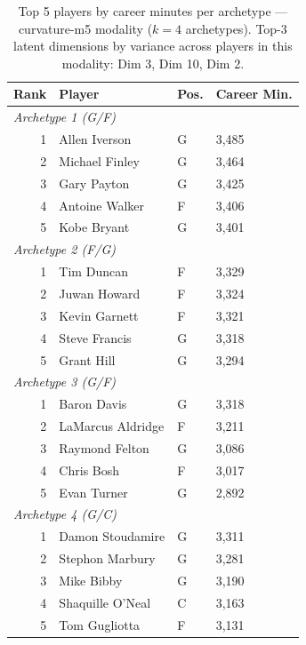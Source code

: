 \begin{table}[htbp]
  \centering\small
  \begin{tabular}{rlll}
    \toprule
    Rank & Player & Pos. & Career Min. \\
    \midrule
    \multicolumn{4}{l}{\textit{Archetype 1 (G/F)}} \\
    \midrule
    1 & Allen Iverson & G & 3,485 \\
    2 & Michael Finley & G & 3,464 \\
    3 & Gary Payton & G & 3,425 \\
    4 & Antoine Walker & F & 3,406 \\
    5 & Kobe Bryant & G & 3,401 \\
    \midrule[0.4pt]
    \multicolumn{4}{l}{\textit{Archetype 2 (F/G)}} \\
    \midrule
    1 & Tim Duncan & F & 3,329 \\
    2 & Juwan Howard & F & 3,324 \\
    3 & Kevin Garnett & F & 3,321 \\
    4 & Steve Francis & G & 3,318 \\
    5 & Grant Hill & G & 3,294 \\
    \midrule[0.4pt]
    \multicolumn{4}{l}{\textit{Archetype 3 (G/F)}} \\
    \midrule
    1 & Baron Davis & G & 3,318 \\
    2 & LaMarcus Aldridge & F & 3,211 \\
    3 & Raymond Felton & G & 3,086 \\
    4 & Chris Bosh & F & 3,017 \\
    5 & Evan Turner & G & 2,892 \\
    \midrule[0.4pt]
    \multicolumn{4}{l}{\textit{Archetype 4 (G/C)}} \\
    \midrule
    1 & Damon Stoudamire & G & 3,311 \\
    2 & Stephon Marbury & G & 3,281 \\
    3 & Mike Bibby & G & 3,190 \\
    4 & Shaquille O'Neal & C & 3,163 \\
    5 & Tom Gugliotta & F & 3,131 \\
    \bottomrule
  \end{tabular}
  \caption{Top 5 players by career minutes per archetype --- curvature-m5 modality ($k=4$ archetypes). Top-3 latent dimensions by variance across players in this modality: Dim 3, Dim 10, Dim 2.}
  \label{tab:arch_reps_curvature_m5}
\end{table}

